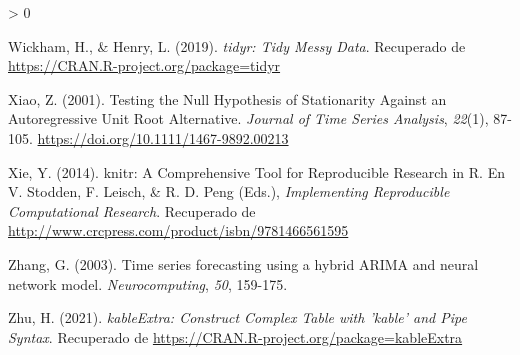 \documentclass[
]{article}
\newlength{\cslhangindent}
\newenvironment{CSLReferences}[2] %
 {%
  \setlength{\parindent}{0pt}
  \ifodd #1 \everypar{\setlength{\hangindent}{\cslhangindent}}\ignorespaces\fi
  \ifnum #2 > 0
  \setlength{\parskip}{#2\baselineskip}
  \fi
 }%
 {}
\begin{document}
\begin{CSLReferences}{1}{0}
\leavevmode\hypertarget{ref-tidyr}{}%
Wickham, H., \& Henry, L. (2019). \emph{tidyr: Tidy Messy Data}.
Recuperado de \url{https://CRAN.R-project.org/package=tidyr}

\leavevmode\hypertarget{ref-doi:10.1111ux2f1467-9892.00213}{}%
Xiao, Z. (2001). Testing the Null Hypothesis of Stationarity Against an
Autoregressive Unit Root Alternative. \emph{Journal of Time Series
Analysis}, \emph{22}(1), 87-105.
\url{https://doi.org/10.1111/1467-9892.00213}

\leavevmode\hypertarget{ref-knitr}{}%
Xie, Y. (2014). knitr: A Comprehensive Tool for Reproducible Research in
{R}. En V. Stodden, F. Leisch, \& R. D. Peng (Eds.), \emph{Implementing
Reproducible Computational Research}. Recuperado de
\url{http://www.crcpress.com/product/isbn/9781466561595}

\leavevmode\hypertarget{ref-Zhang}{}%
Zhang, G. (2003). Time series forecasting using a hybrid ARIMA and
neural network model. \emph{Neurocomputing}, \emph{50}, 159-175.

\leavevmode\hypertarget{ref-kableExtra}{}%
Zhu, H. (2021). \emph{kableExtra: Construct Complex Table with 'kable'
and Pipe Syntax}. Recuperado de
\url{https://CRAN.R-project.org/package=kableExtra}

\end{CSLReferences}
\end{document}
